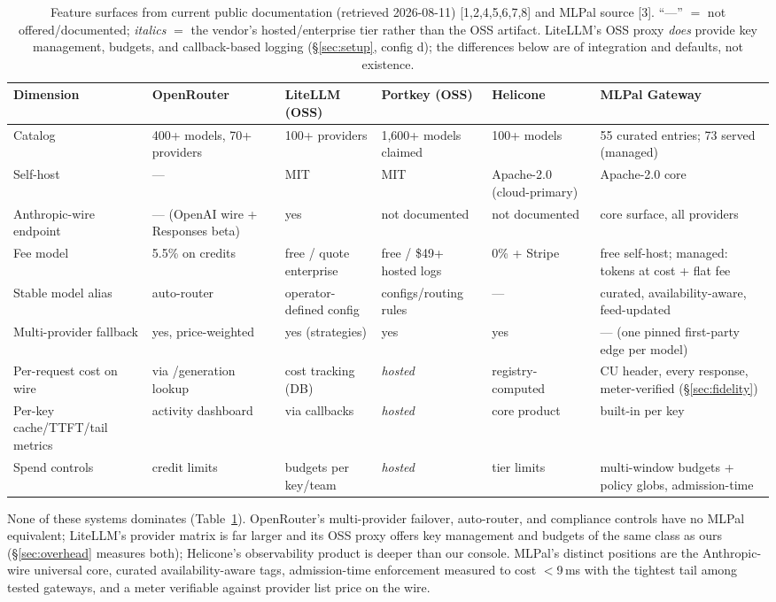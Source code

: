 \documentclass[10pt]{article}
\begin{document}
\begin{table}[t]
\centering\scriptsize
\caption{Feature surfaces from current public documentation (retrieved 2026-08-11) [1,2,4,5,6,7,8] and MLPal source [3]. ``---'' $=$ not offered/documented; \emph{italics} $=$ the vendor's hosted/enterprise tier rather than the OSS artifact. LiteLLM's OSS proxy \emph{does} provide key management, budgets, and callback-based logging (\S\ref{sec:setup}, config d); the differences below are of integration and defaults, not existence.}
\label{tab:features}
\setlength{\tabcolsep}{3.5pt}
\begin{tabular}{p{2.35cm}p{2.5cm}p{2.3cm}p{2.15cm}p{2.05cm}p{2.6cm}}
\toprule
Dimension & OpenRouter & LiteLLM (OSS) & Portkey (OSS) & Helicone & MLPal Gateway \\
\midrule
Catalog & 400+ models, 70+ providers & 100+ providers & 1{,}600+ models claimed & 100+ models & 55 curated entries; 73 served (managed) \\
Self-host & --- & MIT & MIT & Apache-2.0 (cloud-primary) & Apache-2.0 core \\
Anthropic-wire endpoint & --- (OpenAI wire + Responses beta) & yes & not documented & not documented & core surface, all providers \\
Fee model & 5.5\% on credits & free / quote enterprise & free / \$49+ hosted logs & 0\% + Stripe & free self-host; managed: tokens at cost + flat fee \\
Stable model alias & auto-router & operator-defined config & configs/routing rules & --- & curated, availability-aware, feed-updated \\
Multi-provider fallback & yes, price-weighted & yes (strategies) & yes & yes & --- (one pinned first-party edge per model) \\
Per-request cost on wire & via /generation lookup & cost tracking (DB) & \emph{hosted} & registry-computed & CU header, every response, meter-verified (\S\ref{sec:fidelity}) \\
Per-key cache/TTFT/tail metrics & activity dashboard & via callbacks & \emph{hosted} & core product & built-in per key \\
Spend controls & credit limits & budgets per key/team & \emph{hosted} & tier limits & multi-window budgets + policy globs, admission-time \\
\bottomrule
\end{tabular}
\end{table}

None of these systems dominates (Table~\ref{tab:features}). OpenRouter's multi-provider failover, auto-router, and compliance controls have no MLPal equivalent; LiteLLM's provider matrix is far larger and its OSS proxy offers key management and budgets of the same class as ours (\S\ref{sec:overhead} measures both); Helicone's observability product is deeper than our console. MLPal's distinct positions are the Anthropic-wire universal core, curated availability-aware tags, admission-time enforcement measured to cost $<$9\,ms with the tightest tail among tested gateways, and a meter verifiable against provider list price on the wire.
\end{document}
